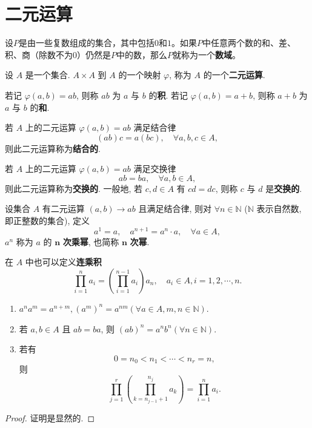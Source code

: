 \documentclass[../../main.tex]{subfiles}%
\begin{document}
\section{二元运算}

\begin{definition}[数域]
设$P$是由一些复数组成的集合，其中包括$0$和$1$。如果$P$中任意两个数的和、差、积、商（除数不为$0$）仍然是$P$中的数，那么$P$就称为一个\textbf{数域}。
\end{definition}

\begin{definition}
设 \( A \) 是一个集合. \( A \times A \) 到 \( A \) 的一个映射 \( \varphi \), 称为 \( A \) 的一个\textbf{二元运算}.

若记 \( \varphi(a,b) = ab \), 则称 \( ab \) 为 \( a \) 与 \( b \) 的\textbf{积}. 若记 \( \varphi(a,b) = a + b \), 则称 \( a + b \) 为 \( a \) 与 \( b \) 的\textbf{和}.

若 \( A \) 上的二元运算 \( \varphi(a,b) = ab \) 满足结合律
\[
(ab)c = a(bc),\quad \forall a,b,c \in A,
\]
则此二元运算称为\textbf{结合的}.

若 \( A \) 上的二元运算 \( \varphi(a,b) = ab \) 满足交换律
\[
ab = ba,\quad \forall a,b \in A,
\]
则此二元运算称为\textbf{交换的}. 一般地, 若 \( c,d \in A \) 有 \( cd = dc \), 则称 \( c \) 与 \( d \) 是\textbf{交换的}.
\end{definition}

\begin{definition}\label{definition:n次乘幂}
设集合 \( A \) 有二元运算 \( (a,b) \to ab \) 且满足结合律, 则对 \( \forall n \in \mathbb{N} \) (\( \mathbb{N} \) 表示自然数, 即正整数的集合), 定义
\[
a^1 = a,\quad a^{n + 1} = a^n \cdot a,\quad \forall a \in A,
\]
\( a^n \) 称为 \( a \) 的  \( \boldsymbol{n} \) \textbf{次乘幂}, 也简称 \( \boldsymbol{n} \) \textbf{次幂}.

在 \( A \) 中也可以定义\textbf{连乘积}
\[
\prod_{i = 1}^n a_i = \left( \prod_{i = 1}^{n - 1} a_i \right) a_n,\quad a_i \in A, i = 1,2,\cdots, n.
\]
\end{definition}

\begin{proposition}\label{proposition:乘幂和连乘积的性质}
\begin{enumerate}
\item \( a^n a^m = a^{n + m}, (a^m)^n = a^{nm} (\forall a \in A, m,n \in \mathbb{N}) \). 

\item 若 \( a,b \in A \) 且 \( ab = ba \), 则 \( (ab)^n = a^n b^n (\forall n \in \mathbb{N}) \).

\item 若有
\[
0 = n_0 < n_1 < \cdots < n_r = n,
\]
则
\[
\prod_{j = 1}^r \left( \prod_{k = n_{j - 1} + 1}^{n_j} a_k \right) = \prod_{i = 1}^n a_i.
\]
\end{enumerate}
\end{proposition}
\begin{proof}

证明是显然的.

\end{proof}
\end{document}
